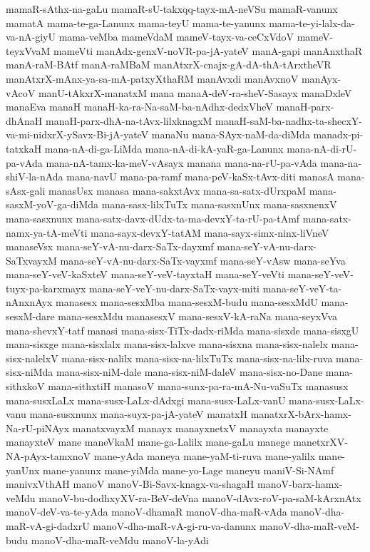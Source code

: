 {mamaR-sAthx-na-gaLu
mamaR-sU-takxqq-tayx-mA-neVSu
mamaR-vanunx
mamatA
mama-te-ga-Lanunx
mama-teyU
mama-te-yanunx
mama-te-yi-lalx-da-va-nA-giyU
mama-veMba
mameVdaM
mameV-tayx-va-ceCxVdoV
mameV-teyxVvaM
mameVti
manAdx-genxV-noVR-pa-jA-yateV
manA-gapi
manAnxthaR
manA-raM-BAtf
manA-raMBaM
manAtxrX-cnajx-gA-dA-thA-tArxtheVR
manAtxrX-mAnx-ya-sa-mA-patxyXthaRM
manAvxdi
manAvxnoV
manAyx-vAcoV
manU-tAkxrX-manatxM
mana
manaA-deV-ra-sheV-Sasayx
manaDxleV
manaEva
manaH
manaH-ka-ra-Na-saM-ba-nAdhx-dedxVheV
manaH-parx-dhAnaH
manaH-parx-dhA-na-tAvx-lilxknagxM
manaH-saM-ba-nadhx-ta-shecxY-va-mi-nidxrX-ySavx-Bi-jA-yateV
manaNu
mana-SAyx-naM-da-diMda
manadx-pi-tatxkaH
mana-nA-di-ga-LiMda
mana-nA-di-kA-yaR-ga-Lanunx
mana-nA-di-rU-pa-vAda
mana-nA-tamx-ka-meV-vAsayx
manana
mana-na-rU-pa-vAda
mana-na-shiV-la-nAda
mana-navU
mana-pa-ramf
mana-peV-kaSx-tAvx-diti
manasA
mana-sAsx-gali
manasUsx
manasa
mana-sakxtAvx
mana-sa-satx-dUrxpaM
mana-sasxM-yoV-ga-diMda
mana-sasx-lilxTuTx
mana-sasxnUnx
mana-sasxnenxV
mana-sasxnunx
mana-satx-davx-dUdx-ta-ma-devxY-ta-rU-pa-tAmf
mana-satx-namx-ya-tA-meVti
mana-sayx-devxY-tatAM
mana-sayx-simx-ninx-liVneV
manaseVsx
mana-seY-vA-nu-darx-SaTx-dayxmf
mana-seY-vA-nu-darx-SaTxvayxM
mana-seY-vA-nu-darx-SaTx-vayxmf
mana-seY-vAsw
mana-seYva
mana-seY-veV-kaSxteV
mana-seY-veV-tayxtaH
mana-seY-veVti
mana-seY-veV-tuyx-pa-karxmayx
mana-seY-veY-nu-darx-SaTx-vayx-miti
mana-seY-veY-ta-nAnxnAyx
manasesx
mana-sesxMba
mana-sesxM-budu
mana-sesxMdU
mana-sesxM-dare
mana-sesxMdu
manasesxV
mana-sesxV-kA-raNa
mana-seyxVva
mana-shevxY-tatf
manasi
mana-sisx-TiTx-dadx-riMda
mana-sisxde
mana-sisxgU
mana-sisxge
mana-sisxlalx
mana-sisx-lalxve
mana-sisxna
mana-sisx-nalelx
mana-sisx-nalelxV
mana-sisx-nalilx
mana-sisx-na-lilxTuTx
mana-sisx-na-lilx-ruva
mana-sisx-niMda
mana-sisx-niM-dale
mana-sisx-niM-daleV
mana-sisx-no-Dane
mana-sithxkoV
mana-sithxtiH
manasoV
mana-sunx-pa-ra-mA-Nu-vaSuTx
manasusx
mana-susxLaLx
mana-susx-LaLx-dAdxgi
mana-susx-LaLx-vanU
mana-susx-LaLx-vanu
mana-susxnunx
mana-suyx-pa-jA-yateV
manatxH
manatxrX-bArx-hamx-Na-rU-piNAyx
manatxvayxM
manayx
manayxnetxV
manayxta
manayxte
manayxteV
mane
maneVkaM
mane-ga-Lalilx
mane-gaLu
manege
manetxrXV-NA-pAyx-tamxnoV
mane-yAda
maneya
mane-yaM-ti-ruva
mane-yalilx
mane-yanUnx
mane-yanunx
mane-yiMda
mane-yo-Lage
maneyu
maniV-Si-NAmf
manivxVthAH
manoV
manoV-Bi-Savx-knagx-va-shagaH
manoV-barx-hamx-veMdu
manoV-bu-dodhxyXV-ra-BeV-deVna
manoV-dAvx-roV-pa-saM-kArxnAtx
manoV-deV-va-te-yAda
manoV-dhamaR
manoV-dha-maR-vAda
manoV-dha-maR-vA-gi-dadxrU
manoV-dha-maR-vA-gi-ru-va-danunx
manoV-dha-maR-veM-budu
manoV-dha-maR-veMdu
manoV-la-yAdi
}

